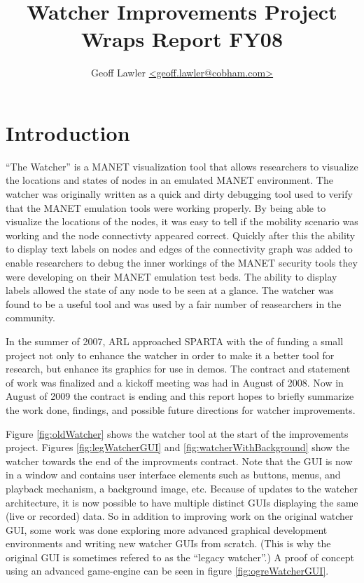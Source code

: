 \documentclass{report}
\author{Geoff Lawler \url{<geoff.lawler@cobham.com>}}
\title{{\bf Watcher Improvements Project}\\Wraps Report FY08}
\begin{document}
\maketitle

\renewcommand*\thesection{\arabic{section}}

\section{Introduction}

``The Watcher'' is a MANET visualization tool that allows researchers to visualize the locations and states of nodes in an emulated MANET environment. The watcher was originally written 
as a quick and dirty debugging tool used to verify that the MANET emulation tools were working properly. By being able to visualize the locations of the nodes, it was easy to 
tell if the mobility scenario was working and the node connectivty appeared correct. Quickly after this the ability to display text labels on nodes and edges of the connectivity 
graph was added to enable researchers to debug the inner workings of the MANET security tools they were developing on their MANET emulation test beds. The ability to display labels
allowed the state of any node to be seen at a glance. The watcher was found to be a useful tool and was used by a fair number of reasearchers in the community. 

In the summer of 2007, ARL approached SPARTA with the of funding a small project not only to enhance the watcher in order to make it a better tool for research, but enhance 
its graphics for use in demos. The contract and statement of work was finalized and a kickoff meeting was had in August of 2008. Now in August of 2009 the contract is ending and 
this report hopes to briefly summarize the work done, findings, and possible future directions for watcher improvements. 

Figure \ref{fig:oldWatcher} shows the watcher tool at the start of the improvements project. Figures \ref{fig:legWatcherGUI} and \ref{fig:watcherWithBackground}
show the watcher towards the end of the improvments contract. Note that the GUI is now in a window and contains user interface elements such as buttons, menus, and playback
mechanism, a background image,  etc. Because of updates to the watcher architecture, it is now possible to have multiple distinct GUIs displaying the same (live or recorded) data. So in addition to improving
work on the original watcher GUI, some work was done exploring more advanced graphical development environments and writing new watcher GUIs from scratch. (This is why the original
GUI is sometimes refered to as the ``legacy watcher''.) A proof of concept using an advanced game-engine can be seen in figure \ref{fig:ogreWatcherGUI}. 
\end{document}
